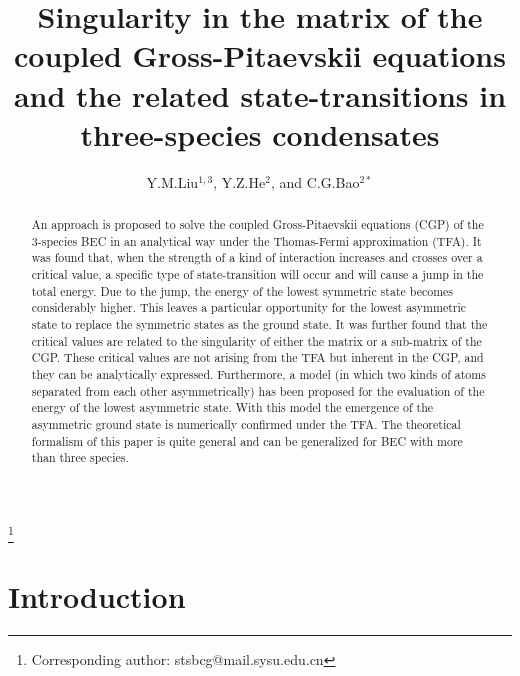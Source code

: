 \documentclass[single-column,showpacs,groupedaddress]{revtex4}
\begin{document}
\title{Singularity in the matrix of the coupled Gross-Pitaevskii equations
and the related state-transitions in three-species condensates }
\author{Y.M.Liu$^{1,3}$, Y.Z.He$^2$, and C.G.Bao$^{2*}$}

\begin{abstract}
An approach is proposed to solve the coupled Gross-Pitaevskii equations
(CGP) of the 3-species BEC in an analytical way under the Thomas-Fermi
approximation (TFA). It was found that, when the strength of a kind of
interaction increases and crosses over a critical value, a specific type of
state-transition will occur and will cause a jump in the total energy. Due
to the jump, the energy of the lowest symmetric state becomes considerably
higher. This leaves a particular opportunity for the lowest asymmetric state
to replace the symmetric states as the ground state. It was further found
that the critical values are related to the singularity of either the matrix
or a sub-matrix of the CGP. These critical values are not arising from the
TFA but inherent in the CGP, and they can be analytically expressed.
Furthermore, a model (in which two kinds of atoms separated from each other
asymmetrically) has been proposed for the evaluation of the energy of the
lowest asymmetric state. With this model the emergence of the asymmetric
ground state is numerically confirmed under the TFA. The theoretical
formalism of this paper is quite general and can be generalized for BEC with
more than three species.
\end{abstract}

\thanks{Corresponding author: stsbcg@mail.sysu.edu.cn}
\maketitle

\section*{Introduction}
\end{document}
